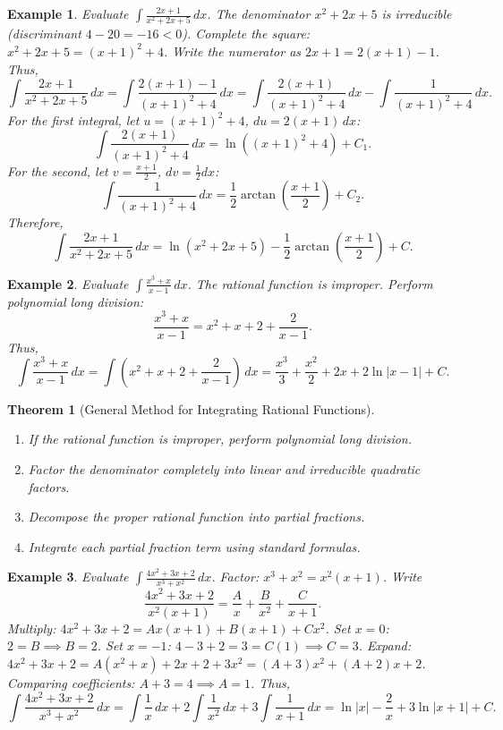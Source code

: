 \documentclass[11pt,a4paper]{article}
\newtheorem{example}{Example}
\newtheorem{theorem}{Theorem}
\begin{document}
\begin{example}
Evaluate $\displaystyle \int \frac{2x + 1}{x^2 + 2x + 5} \, dx$.
The denominator $x^2 + 2x + 5$ is irreducible (discriminant $4 - 20 = -16 < 0$). Complete the square: $x^2 + 2x + 5 = (x+1)^2 + 4$. Write the numerator as $2x + 1 = 2(x+1) - 1$. Thus,
\[
\int \frac{2x + 1}{x^2 + 2x + 5} \, dx = \int \frac{2(x+1) - 1}{(x+1)^2 + 4} \, dx = \int \frac{2(x+1)}{(x+1)^2 + 4} \, dx - \int \frac{1}{(x+1)^2 + 4} \, dx.
\]
For the first integral, let $u = (x+1)^2 + 4$, $du = 2(x+1) \, dx$:
\[
\int \frac{2(x+1)}{(x+1)^2 + 4} \, dx = \ln((x+1)^2 + 4) + C_1.
\]
For the second, let $v = \frac{x+1}{2}$, $dv = \frac{1}{2} dx$:
\[
\int \frac{1}{(x+1)^2 + 4} \, dx = \frac{1}{2} \arctan\left( \frac{x+1}{2} \right) + C_2.
\]
Therefore,
\[
\int \frac{2x + 1}{x^2 + 2x + 5} \, dx = \ln(x^2 + 2x + 5) - \frac{1}{2} \arctan\left( \frac{x+1}{2} \right) + C.
\]
\end{example}
\begin{example}
Evaluate $\displaystyle \int \frac{x^3 + x}{x - 1} \, dx$.
The rational function is improper. Perform polynomial long division:
\[
\frac{x^3 + x}{x - 1} = x^2 + x + 2 + \frac{2}{x - 1}.
\]
Thus,
\[
\int \frac{x^3 + x}{x - 1} \, dx = \int \left( x^2 + x + 2 + \frac{2}{x-1} \right) \, dx = \frac{x^3}{3} + \frac{x^2}{2} + 2x + 2\ln|x-1| + C.
\]
\end{example}
\begin{theorem}[General Method for Integrating Rational Functions]
\begin{enumerate}
\item If the rational function is improper, perform polynomial long division.
\item Factor the denominator completely into linear and irreducible quadratic factors.
\item Decompose the proper rational function into partial fractions.
\item Integrate each partial fraction term using standard formulas.
\end{enumerate}
\end{theorem}
\begin{example}
Evaluate $\displaystyle \int \frac{4x^2 + 3x + 2}{x^3 + x^2} \, dx$.
Factor: $x^3 + x^2 = x^2(x+1)$. Write
\[
\frac{4x^2 + 3x + 2}{x^2(x+1)} = \frac{A}{x} + \frac{B}{x^2} + \frac{C}{x+1}.
\]
Multiply: $4x^2 + 3x + 2 = Ax(x+1) + B(x+1) + Cx^2$.
Set $x = 0$: $2 = B \implies B = 2$.
Set $x = -1$: $4 - 3 + 2 = 3 = C(1) \implies C = 3$.
Expand: $4x^2 + 3x + 2 = A(x^2 + x) + 2x + 2 + 3x^2 = (A+3)x^2 + (A+2)x + 2$.
Comparing coefficients: $A + 3 = 4 \implies A = 1$.
Thus,
\[
\int \frac{4x^2 + 3x + 2}{x^3 + x^2} \, dx = \int \frac{1}{x} \, dx + 2 \int \frac{1}{x^2} \, dx + 3 \int \frac{1}{x+1} \, dx = \ln|x| - \frac{2}{x} + 3\ln|x+1| + C.
\]
\end{example}
\end{document}
